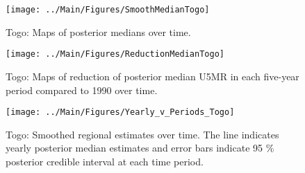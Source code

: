 \documentclass[12pt]{article}\usepackage[]{graphicx}\usepackage[]{color}
\newenvironment{knitrout}{}{} %
\begin{document}
\begin{knitrout}
\color{fgcolor}\begin{figure}[bht]

{\centering \texttt{[image: ../Main/Figures/SmoothMedianTogo]} 

}

\caption[Togo]{Togo: Maps of posterior medians over time.}\label{fig:unnamed-chunk-314}
\end{figure}


\end{knitrout}
\begin{knitrout}
\color{fgcolor}\begin{figure}[bht]

{\centering \texttt{[image: ../Main/Figures/ReductionMedianTogo]} 

}

\caption[Togo]{Togo: Maps of reduction of posterior median U5MR in each five-year period compared to 1990 over time.}\label{fig:unnamed-chunk-315}
\end{figure}


\end{knitrout}
\begin{knitrout}
\color{fgcolor}\begin{figure}[bht]

{\centering \texttt{[image: ../Main/Figures/Yearly\_v\_Periods\_Togo]} 

}

\caption[Togo]{Togo: Smoothed regional estimates over time. The line indicates yearly posterior median estimates and error bars indicate 95 \% posterior credible interval at each time period.}\label{fig:unnamed-chunk-316}
\end{figure}


\end{knitrout}
\end{document}
